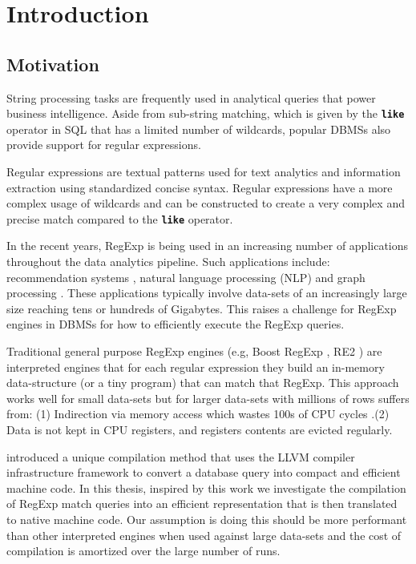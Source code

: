 
\chapter{Introduction}\label{chapter:introduction}

\section{Motivation}
String processing tasks are frequently used in analytical queries that power business intelligence. Aside from sub-string matching, which is given by the \texttt{\textbf{like}} operator in SQL that has a limited number of wildcards, popular DBMSs also provide support for regular expressions.

Regular expressions are textual patterns used for text analytics and information extraction using standardized concise syntax. Regular expressions have a more complex usage of wildcards and can be constructed to create a very complex and precise match compared to the \texttt{\textbf{like}} operator.

In the recent years, RegExp is being used in an increasing number of applications throughout the data analytics pipeline. Such applications include: recommendation systems \cite{recsys1}, natural language processing (NLP) \cite{nlp1, nlp2} and graph processing \cite{graph1}. These applications typically involve data-sets of an increasingly large size reaching tens or hundreds of Gigabytes. This raises a challenge for RegExp engines in DBMSs for how to efficiently execute the RegExp queries.

Traditional general purpose RegExp engines (e.g, Boost RegExp \cite{Boost}, RE2 \cite{re2}) are interpreted engines  that for each regular expression they build an in-memory data-structure (or a tiny program) that can match that RegExp. This approach works well for small data-sets but for larger data-sets with millions of rows suffers from: (1) Indirection via memory access which wastes 100s of CPU cycles \cite{cpumemgap}.(2) Data is not kept in CPU registers, and registers contents are evicted regularly.

\citet{querycomp} introduced a unique compilation method that uses the LLVM \cite{llvm} compiler infrastructure framework to convert a database query into compact and efficient machine code. In this thesis, inspired by this work we investigate the compilation of RegExp match queries into an efficient representation that is then translated to native machine code. Our assumption is doing this should be more performant than other interpreted engines when used against large data-sets and the cost of compilation is amortized over the large number of runs.

